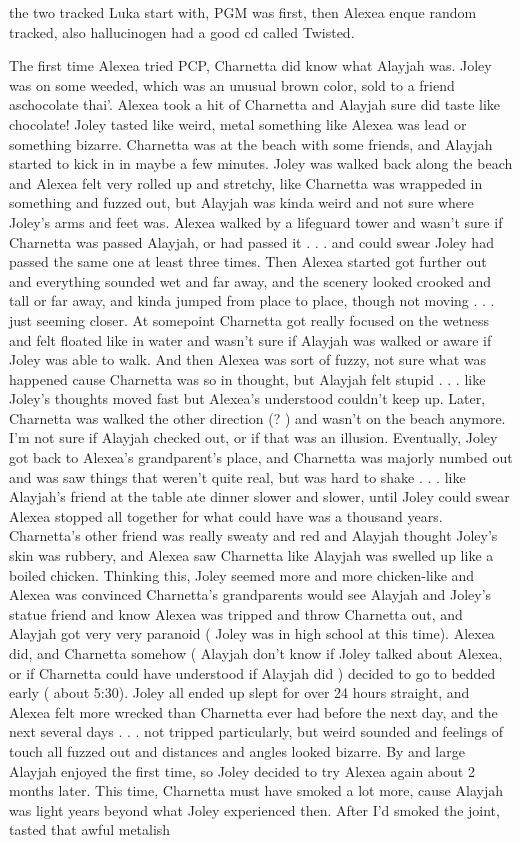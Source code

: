 \documentclass[12pt]{book}
\begin{document}
the two tracked Luka start with, PGM was first, then Alexea enque random tracked, also hallucinogen had a good cd called Twisted.



The first time Alexea tried PCP, Charnetta did know what Alayjah was. Joley was on some weeded, which was an unusual brown color, sold to a friend aschocolate thai'. Alexea took a hit of Charnetta and Alayjah sure did taste like chocolate! Joley tasted like weird, metal something like Alexea was lead or something bizarre. Charnetta was at the beach with some friends, and Alayjah started to kick in in maybe a few minutes. Joley was walked back along the beach and Alexea felt very rolled up and stretchy, like Charnetta was wrappeded in something and fuzzed out, but Alayjah was kinda weird and not sure where Joley's arms and feet was. Alexea walked by a lifeguard tower and wasn't sure if Charnetta was passed Alayjah, or had passed it . . .  and could swear Joley had passed the same one at least three times. Then Alexea started got further out and everything sounded wet and far away, and the scenery looked crooked and tall or far away, and kinda jumped from place to place, though not moving . . .  just seeming closer. At somepoint Charnetta got really focused on the wetness and felt floated like in water and wasn't sure if Alayjah was walked or aware if Joley was able to walk. And then Alexea was sort of fuzzy, not sure what was happened cause Charnetta was so in thought, but Alayjah felt stupid . . .  like Joley's thoughts moved fast but Alexea's understood couldn't keep up. Later, Charnetta was walked the other direction (? ) and wasn't on the beach anymore. I'm not sure if Alayjah checked out, or if that was an illusion. Eventually, Joley got back to Alexea's grandparent's place, and Charnetta was majorly numbed out and was saw things that weren't quite real, but was hard to shake . . .  like Alayjah's friend at the table ate dinner slower and slower, until Joley could swear Alexea stopped all together for what could have was a thousand years. Charnetta's other friend was really sweaty and red and Alayjah thought Joley's skin was rubbery, and Alexea saw Charnetta like Alayjah was swelled up like a boiled chicken. Thinking this, Joley seemed more and more chicken-like and Alexea was convinced Charnetta's grandparents would see Alayjah and Joley's statue friend and know Alexea was tripped and throw Charnetta out, and Alayjah got very very paranoid ( Joley was in high school at this time). Alexea did, and Charnetta somehow ( Alayjah don't know if Joley talked about Alexea, or if Charnetta could have understood if Alayjah did ) decided to go to bedded early ( about 5:30). Joley all ended up slept for over 24 hours straight, and Alexea felt more wrecked than Charnetta ever had before the next day, and the next several days . . .  not tripped particularly, but weird sounded and feelings of touch all fuzzed out and distances and angles looked bizarre. By and large Alayjah enjoyed the first time, so Joley decided to try Alexea again about 2 months later. This time, Charnetta must have smoked a lot more, cause Alayjah was light years beyond what Joley experienced then. After I'd smoked the joint, tasted that awful metalish 
\end{document}

